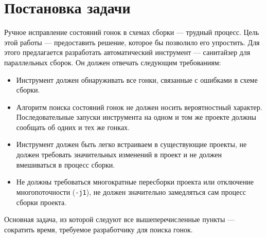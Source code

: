 \section{Постановка задачи}
\label{sec:Chapter1} 


Ручное исправление состояний гонок в схемах сборки --- трудный процесс. Цель этой работы --- предоставить решение, которое бы позволило его упростить. Для этого предлагается разработать автоматический инструмент --- санитайзер для параллельных сборок. Он должен отвечать следующим требованиям:

\begin{itemize}
	\item Инструмент должен обнаруживать все гонки, связанные с ошибками в схеме сборки.
	\item Алгоритм поиска состояний гонок не должен носить вероятностный характер. Последовательные запуски инструмента на одном и том же проекте должны сообщать об одних и тех же гонках. 
	\item Инструмент должен быть легко встраиваем в существующие проекты, не должен требовать значительных изменений в проект и не должен вмешиваться в процесс сборки. 
	\item  Не должны требоваться многократные пересборки проекта или отключение многопоточности (\texttt{-j1}), не должен значительно замедляться сам процесс сборки проекта.
\end{itemize}

Основная задача, из которой следуют все вышеперечисленные пункты --- сократить время, требуемое разработчику для поиска гонок.
